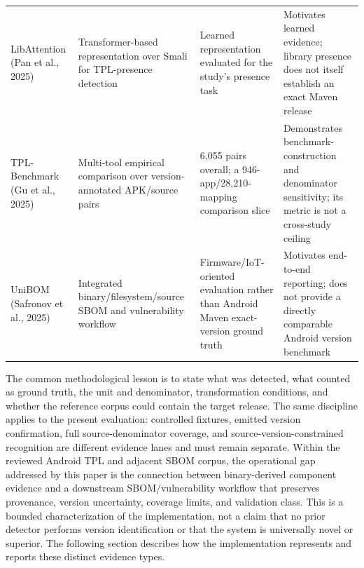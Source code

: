 \documentclass[10pt,twocolumn]{article}
\begin{document}
\begin{center}
\begin{tabularx}{\columnwidth}{@{}X@{}X@{}X@{}X@{}}
LibAttention (Pan et al., 2025) & Transformer-based representation over Smali for TPL-presence detection & Learned representation evaluated for the study's presence task & Motivates learned evidence; library presence does not itself establish an exact Maven release \\
TPL-Benchmark (Gu et al., 2025) & Multi-tool empirical comparison over version-annotated APK/source pairs & 6,055 pairs overall; a 946-app/28,210-mapping comparison slice & Demonstrates benchmark-construction and denominator sensitivity; its metric is not a cross-study ceiling \\
UniBOM (Safronov et al., 2025) & Integrated binary/filesystem/source SBOM and vulnerability workflow & Firmware/IoT-oriented evaluation rather than Android Maven exact-version ground truth & Motivates end-to-end reporting; does not provide a directly comparable Android version benchmark \\
\end{tabularx}\end{center}
The common methodological lesson is to state what was detected, what counted as ground truth, the unit and denominator, transformation conditions, and whether the reference corpus could contain the target release. The same discipline applies to the present evaluation: controlled fixtures, emitted version confirmation, full source-denominator coverage, and source-version-constrained recognition are different evidence lanes and must remain separate.
Within the reviewed Android TPL and adjacent SBOM corpus, the operational gap addressed by this paper is the connection between binary-derived component evidence and a downstream SBOM/vulnerability workflow that preserves provenance, version uncertainty, coverage limits, and validation class. This is a bounded characterization of the implementation, not a claim that no prior detector performs version identification or that the system is universally novel or superior. The following section describes how the implementation represents and reports these distinct evidence types.
\end{document}
